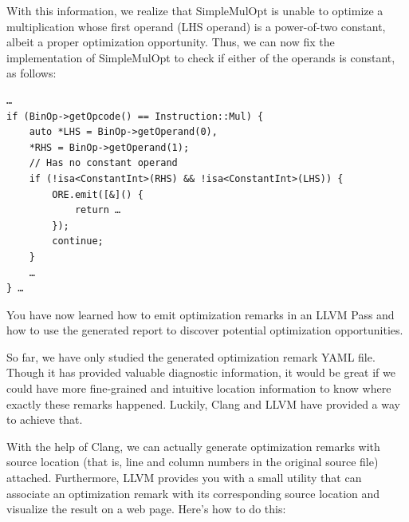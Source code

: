 \begin{enumerate}
With this information, we realize that SimpleMulOpt is unable to optimize a multiplication whose first operand (LHS operand) is a power-of-two constant, albeit a proper optimization opportunity. Thus, we can now fix the implementation of SimpleMulOpt to check if either of the operands is constant, as follows:

\begin{lstlisting}[style=styleCXX]
…
if (BinOp->getOpcode() == Instruction::Mul) {
	auto *LHS = BinOp->getOperand(0),
	*RHS = BinOp->getOperand(1);
	// Has no constant operand
	if (!isa<ConstantInt>(RHS) && !isa<ConstantInt>(LHS)) {
		ORE.emit([&]() {
			return …
		});
		continue;
	}
	…
} …
\end{lstlisting}

You have now learned how to emit optimization remarks in an LLVM Pass and how to use the generated report to discover potential optimization opportunities.

\end{enumerate}

So far, we have only studied the generated optimization remark YAML file. Though it has provided valuable diagnostic information, it would be great if we could have more fine-grained and intuitive location information to know where exactly these remarks happened. Luckily, Clang and LLVM have provided a way to achieve that.

With the help of Clang, we can actually generate optimization remarks with source location (that is, line and column numbers in the original source file) attached. Furthermore, LLVM provides you with a small utility that can associate an optimization remark with its corresponding source location and visualize the result on a web page. Here's how to do this:

